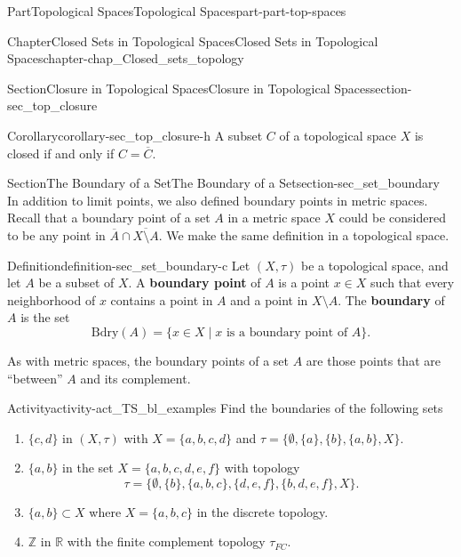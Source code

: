 \documentclass[oneside,10pt,]{book}
\newcommand{\terminology}[1]{\textbf{#1}}
\numberwithin{equation}{chapter}
\newcommand{\Z}{\mathbb{Z}}
\newcommand{\R}{\mathbb{R}}
\newcommand{\Bdry}{\text{Bdry}}
\begin{document}
\begin{partptx}{Part}{Topological Spaces}{}{Topological Spaces}{}{}{part-part-top-spaces}
\begin{chapterptx}{Chapter}{Closed Sets in Topological Spaces}{}{Closed Sets in Topological Spaces}{}{}{chapter-chap_Closed_sets_topology}
\begin{sectionptx}{Section}{Closure in Topological Spaces}{}{Closure in Topological Spaces}{}{}{section-sec_top_closure}
\begin{corollary}{Corollary}{}{}{corollary-sec_top_closure-h}
A subset \(C\) of a topological space \(X\) is closed if and only if \(C = \overline{C}\).%
\end{corollary}
\end{sectionptx}
%
%
\typeout{************************************************}
\typeout{************************************************}
%
\begin{sectionptx}{Section}{The Boundary of a Set}{}{The Boundary of a Set}{}{}{section-sec_set_boundary}
In addition to limit points, we also defined boundary points in metric spaces. Recall that a boundary point of a set \(A\) in a metric space \(X\) could be considered to be any point in \(\overline{A} \cap \overline{X \setminus A}\). We make the same definition in a topological space.%
\begin{definition}{Definition}{}{definition-sec_set_boundary-c}%
%
%
Let \((X, \tau)\) be a topological space, and let \(A\) be a subset of \(X\). A \terminology{boundary point} of \(A\) is a point \(x \in X\) such that every neighborhood of \(x\) contains a point in \(A\) and a point in \(X \setminus A\). The \terminology{boundary} of \(A\) is the set%
\begin{equation*}
\Bdry(A) = \{x \in X \mid x \text{ is a boundary point of }  A\}\text{.}
\end{equation*}
%
\end{definition}
As with metric spaces, the boundary points of a set \(A\) are those points that are ``between'' \(A\) and its complement.%
\begin{activity}{Activity}{}{activity-act_TS_bl_examples}%
Find the boundaries of the following sets%
\begin{enumerate}[font=\bfseries,label=(\alph*),ref=\alph*]%
\item{}\(\{c,d\}\) in \((X, \tau)\) with \(X= \{a,b,c,d\}\) and \(\tau = \{\emptyset, \{a\}, \{b\}, \{a,b\}, X \}\).%
\item{}\(\{a,b\}\) in the set \(X= \{a,b,c,d,e,f\}\) with topology%
\begin{equation*}
\tau= \{\emptyset,\{b\}, \{a,b,c\},\{d,e,f\},\{b,d,e,f\}, X\}\text{.}
\end{equation*}
%
\item{}\(\{a,b\} \subset X\) where \(X = \{a,b,c\}\) in the discrete topology.%
\item{}\(\Z\) in \(\R\) with the finite complement topology \(\tau_{FC}\).%
\end{enumerate}%

\end{activity}
\end{sectionptx}
\end{chapterptx}
\end{partptx}
\end{document}
